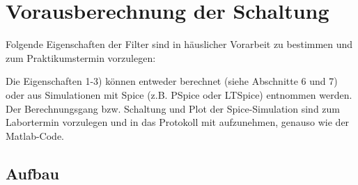 \section{ Vorausberechnung der Schaltung}

Folgende Eigenschaften der Filter sind in häuslicher Vorarbeit zu bestimmen und zum Praktikumstermin vorzulegen:

Die Eigenschaften 1-3) können entweder berechnet (siehe Abschnitte 6 und 7) oder aus Simulationen mit Spice (z.B. PSpice oder LTSpice) entnommen werden. Der Berechnungsgang bzw. Schaltung und Plot der Spice-Simulation sind zum Labortermin vorzulegen und in das Protokoll mit aufzunehmen, genauso wie der Matlab-Code.


\subsection{Aufbau}


